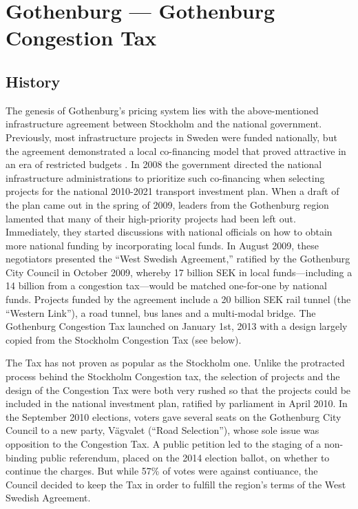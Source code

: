 
\section{Gothenburg --- Gothenburg Congestion Tax}

\subsection{History}


The genesis of Gothenburg's pricing system lies with the above-mentioned infrastructure agreement between Stockholm and the national government. Previously, most infrastructure projects in Sweden were funded nationally, but the agreement demonstrated a local co-financing model that proved attractive in an era of restricted budgets \citep{Borjesson2015,Hysing2015b}. In 2008 the government directed the national infrastructure administrations to prioritize such co-financing when selecting projects for the national 2010-2021 transport investment plan. When a draft of the plan came out in the spring of 2009, leaders from the Gothenburg region lamented that many of their high-priority projects had been left out. Immediately, they started discussions with national officials on how to obtain more national funding by incorporating local funds. In August 2009, these negotiators presented the ``West Swedish Agreement,'' ratified by the Gothenburg City Council in October 2009, whereby 17 billion SEK in local funds---including a 14 billion from a congestion tax---would be matched one-for-one by national funds. Projects funded by the agreement include a 20 billion SEK rail tunnel (the ``Western Link''), a road tunnel, bus lanes and a multi-modal bridge. 
The Gothenburg Congestion Tax launched on January 1st, 2013 with a design largely copied from the Stockholm Congestion Tax (see below). 

The Tax has not proven as popular as the Stockholm one. Unlike the protracted process behind the Stockholm Congestion tax, the selection of projects and the design of the Congestion Tax were both very rushed so that the projects could be included in the national investment plan, ratified by parliament in April 2010. In the September 2010 elections, voters gave several seats on the Gothenburg City Council to a new party, Vägvalet (``Road Selection''), whose sole issue was opposition to the Congestion Tax. A public petition led to the staging of a non-binding public referendum, placed on the 2014 election ballot, on whether to continue the charges. But while 57\% of votes were against contiuance, the Council decided to keep the Tax in order to fulfill the region's terms of the West Swedish Agreement.

